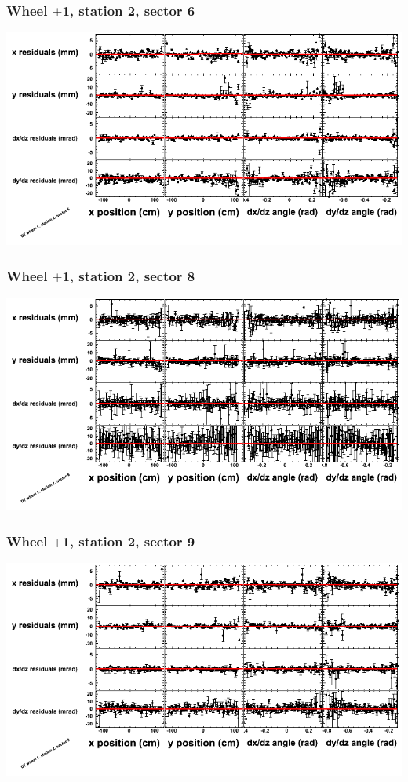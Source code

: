 \documentclass[compress]{beamer}
\begin{document}
\begin{frame}
\frametitle{Wheel $+$1, station 2, sector 6}
\includegraphics[width=\linewidth]{tmppoly_MBwhDst2sec06.png}
\end{frame}

\begin{frame}
\frametitle{Wheel $+$1, station 2, sector 8}
\includegraphics[width=\linewidth]{tmppoly_MBwhDst2sec08.png}
\end{frame}

\begin{frame}
\frametitle{Wheel $+$1, station 2, sector 9}
\includegraphics[width=\linewidth]{tmppoly_MBwhDst2sec09.png}
\end{frame}
\end{document}
